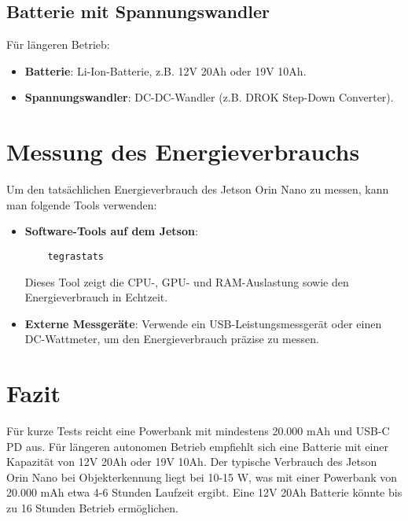 \documentclass[12pt]{article}
\begin{document}
\subsection{Batterie mit Spannungswandler}
Für längeren Betrieb:
\begin{itemize}
    \item \textbf{Batterie}: Li-Ion-Batterie, z.B. 12V 20Ah oder 19V 10Ah.
    \item \textbf{Spannungswandler}: DC-DC-Wandler (z.B. DROK Step-Down Converter).
\end{itemize}

\section{Messung des Energieverbrauchs}
Um den tatsächlichen Energieverbrauch des Jetson Orin Nano zu messen, kann man folgende Tools verwenden:
\begin{itemize}
    \item \textbf{Software-Tools auf dem Jetson}:
    \begin{verbatim}
    tegrastats
    \end{verbatim}
    Dieses Tool zeigt die CPU-, GPU- und RAM-Auslastung sowie den Energieverbrauch in Echtzeit.

    \item \textbf{Externe Messgeräte}: 
    Verwende ein USB-Leistungsmessgerät oder einen DC-Wattmeter, um den Energieverbrauch präzise zu messen.
\end{itemize}

\section{Fazit}
Für kurze Tests reicht eine Powerbank mit mindestens 20.000 mAh und USB-C PD aus. Für längeren autonomen Betrieb empfiehlt sich eine Batterie mit einer Kapazität von 12V 20Ah oder 19V 10Ah. Der typische Verbrauch des Jetson Orin Nano bei Objekterkennung liegt bei 10-15 W, was mit einer Powerbank von 20.000 mAh etwa 4-6 Stunden Laufzeit ergibt. Eine 12V 20Ah Batterie könnte bis zu 16 Stunden Betrieb ermöglichen.
\end{document}
